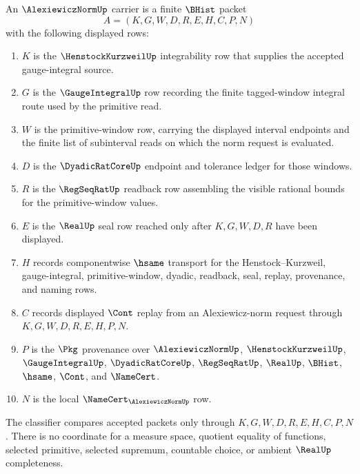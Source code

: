 \begin{definition}
\label{def:alexiewicz-norm-carrier}
An $\AlexiewiczNormUp$ carrier is a finite $\BHist$ packet
$$
A=(K,G,W,D,R,E,H,C,P,N)
$$
with the following displayed rows:
\begin{enumerate}
\item $K$ is the $\HenstockKurzweilUp$ integrability row that supplies the accepted gauge-integral source.
\item $G$ is the $\GaugeIntegralUp$ row recording the finite tagged-window integral route used by the primitive read.
\item $W$ is the primitive-window row, carrying the displayed interval endpoints and the finite list of subinterval reads on which the norm request is evaluated.
\item $D$ is the $\DyadicRatCoreUp$ endpoint and tolerance ledger for those windows.
\item $R$ is the $\RegSeqRatUp$ readback row assembling the visible rational bounds for the primitive-window values.
\item $E$ is the $\RealUp$ seal row reached only after $K,G,W,D,R$ have been displayed.
\item $H$ records componentwise $\hsame$ transport for the Henstock--Kurzweil, gauge-integral, primitive-window, dyadic, readback, seal, replay, provenance, and naming rows.
\item $C$ records displayed $\Cont$ replay from an Alexiewicz-norm request through $K,G,W,D,R,E,H,P,N$.
\item $P$ is the $\Pkg$ provenance over $\AlexiewiczNormUp$, $\HenstockKurzweilUp$, $\GaugeIntegralUp$, $\DyadicRatCoreUp$, $\RegSeqRatUp$, $\RealUp$, $\BHist$, $\hsame$, $\Cont$, and $\NameCert$.
\item $N$ is the local $\NameCert_{\AlexiewiczNormUp}$ row.
\end{enumerate}
The classifier compares accepted packets only through $K,G,W,D,R,E,H,C,P,N$. There is no coordinate for a measure space, quotient equality of functions, selected primitive, selected supremum, countable choice, or ambient $\RealUp$ completeness.
\end{definition}

